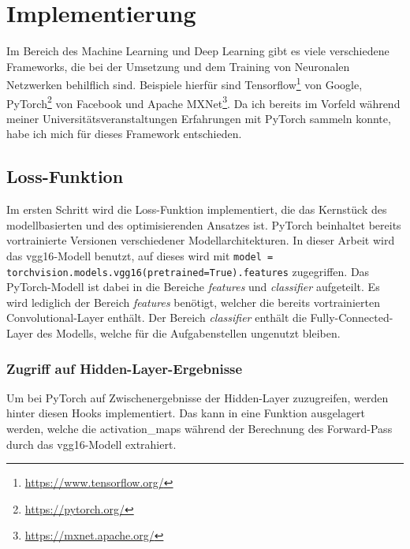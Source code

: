 \chapter{Implementierung}
\label{cha:implementation}

Im Bereich des Machine Learning und Deep Learning gibt es viele verschiedene Frameworks, die bei der Umsetzung und dem Training von Neuronalen Netzwerken behilflich sind. Beispiele hierfür sind Tensorflow\footnote{\url{https://www.tensorflow.org/}} von Google, PyTorch\footnote{\url{https://pytorch.org/}} von Facebook und Apache MXNet\footnote{\url{https://mxnet.apache.org/}}. Da ich bereits im Vorfeld während meiner Universitätsveranstaltungen Erfahrungen mit PyTorch sammeln konnte, habe ich mich für dieses Framework entschieden.

\section{Loss-Funktion}

Im ersten Schritt wird die Loss-Funktion implementiert, die das Kernstück des modellbasierten und des optimisierenden Ansatzes ist.
PyTorch beinhaltet bereits vortrainierte Versionen verschiedener Modellarchitekturen. In dieser Arbeit wird das \gls{vgg16}-Modell benutzt, auf dieses wird mit \texttt{model = torchvision.models.vgg16(pretrained=True).features} zugegriffen. Das PyTorch-Modell ist dabei in die Bereiche \textit{features} und \textit{classifier} aufgeteilt. Es wird lediglich der Bereich \textit{features} benötigt, welcher die bereits vortrainierten Convolutional-Layer enthält. Der Bereich \textit{classifier} enthält die Fully-Connected-Layer des Modells, welche für die Aufgabenstellen ungenutzt bleiben.

\pagebreak

\subsection{Zugriff auf Hidden-Layer-Ergebnisse}

Um bei PyTorch auf Zwischenergebnisse der Hidden-Layer zuzugreifen, werden hinter diesen Hooks implementiert. Das kann in eine Funktion ausgelagert werden, welche die \gls{activation_map}s während der Berechnung des Forward-Pass durch das \gls{vgg16}-Modell extrahiert.

